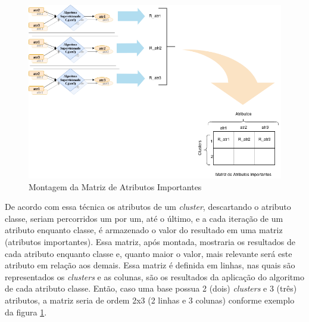 \begin{figure}[h!]
        \centering
        \includegraphics[scale=0.5]{figs/montagem_matrizAtribImp.png}
        \caption{Montagem da Matriz de Atributos Importantes } \label{fig:matribimp}
\end{figure}




De acordo com essa técnica os atributos de um \textit{cluster}, descartando o atributo classe, seriam percorridos um por um, até o último, e a cada iteração de um atributo enquanto classe, é armazenado o valor do resultado em uma matriz (atributos importantes). Essa matriz, após montada, mostraria os resultados de cada atributo enquanto classe e, quanto maior o valor, mais relevante será este atributo em relação aos demais. Essa matriz é definida em linhas, nas quais são representados os \textit{clusters} e  as colunas, são os resultados da aplicação do algoritmo de cada atributo classe. Então, caso uma base possua 2 (dois) \textit{clusters} e 3 (três) atributos, a matriz seria de ordem 2x3 (2 linhas e 3 colunas) conforme exemplo da figura  \ref{fig:matribimp}.


